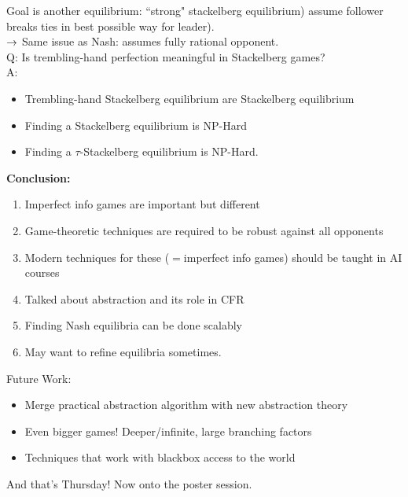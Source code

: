 Goal is another equilibrium: ``strong" stackelberg equilibrium) assume follower breaks ties in best possible way for leader). \\

$\rightarrow$ Same issue as Nash: assumes fully rational opponent. \\

Q: Is trembling-hand perfection meaningful in Stackelberg games? \\

A:
\begin{theorem}
\begin{itemize}
    \item Trembling-hand Stackelberg equilibrium are Stackelberg equilibrium
    \item Finding a Stackelberg equilibrium is NP-Hard
    \item Finding a $\tau$-Stackelberg equilibrium is NP-Hard.
\end{itemize}
\end{theorem}

{\bf Conclusion:}
\begin{enumerate}
    \item Imperfect info games are important but different
    \item Game-theoretic techniques are required to be robust against all opponents
    \item Modern techniques for these ($=$imperfect info games) should be taught in AI courses
    \item Talked about abstraction and its role in CFR
    \item Finding Nash equilibria can be done scalably
    \item May want to refine equilibria sometimes.
\end{enumerate}

Future Work:
\begin{itemize}
    \item Merge practical abstraction algorithm with new abstraction theory
    \item Even bigger games! Deeper/infinite, large branching factors
    \item Techniques that work with blackbox access to the world
\end{itemize}

And that's Thursday! Now onto the poster session.

\spacerule
